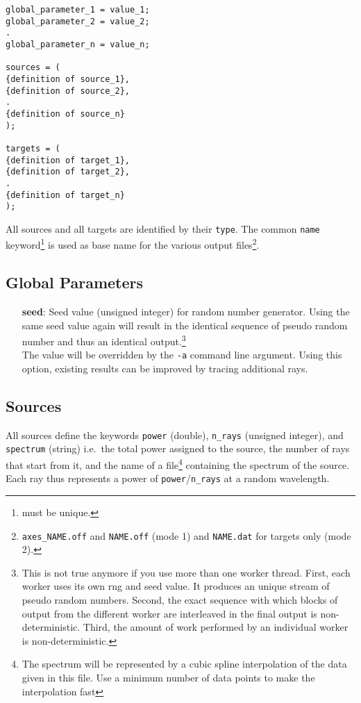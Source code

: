 \documentclass[10pt,a4paper,titlepage]{article}
\begin{document}
\begin{verbatim}
global_parameter_1 = value_1;
global_parameter_2 = value_2;
.
global_parameter_n = value_n;

sources = (
{definition of source_1},
{definition of source_2},
.
{definition of source_n}
);

targets = (
{definition of target_1}, 
{definition of target_2},
.
{definition of target_n}
);
\end{verbatim}

All sources and all targets are identified by their {\tt type}. The common {\tt name} keyword\footnote{must be unique.} is used as base name for the various output files\footnote{{\tt axes\_NAME.off} and {\tt NAME.off} (mode 1) and {\tt NAME.dat} for targets only (mode 2).}.

\subsection{Global Parameters}
\begin{itemize}
\item[{\bf seed}:]{Seed value (unsigned integer) for random number generator. Using the same seed value again will result in the identical sequence of pseudo random number and thus an identical output.\footnote{This is not true anymore if you use more than one worker thread. First, each worker uses its own rng and seed value. It produces an unique stream of pseudo random numbers. Second, the exact sequence with which blocks of output from the different worker are interleaved in the final output is non-deterministic. Third, the amount of work performed by an individual worker is non-deterministic.}\\
The value will be overridden by the {\tt -a} command line argument. Using this option, existing results can be improved by tracing additional rays.}
\end{itemize}



\subsection{Sources}

All sources define the keywords {\tt power} (double), {\tt n\_rays} (unsigned integer), and {\tt spectrum} (string) i.e.\ the total power assigned to the source, the number of rays that start from it, and the name of a file\footnote{The spectrum will be represented by a cubic spline interpolation of the data given in this file. Use a minimum number of data points to make the interpolation fast} containing the spectrum of the source. Each ray thus represents a power of {\tt power}/{\tt n\_rays} at a random wavelength.
\end{document}
